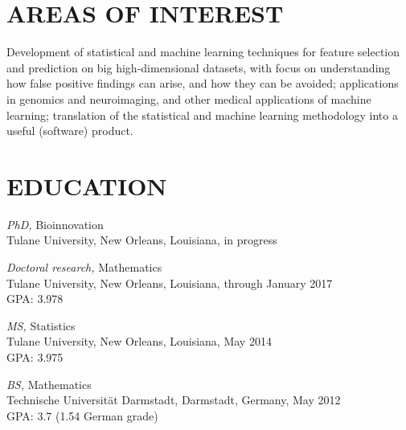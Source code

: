 \documentclass[margin]{res} %
\begin{document}
\begin{resume}
%
%
%
%

\section{AREAS OF INTEREST}

Development of statistical and machine learning techniques for feature selection and prediction on big high-dimensional datasets, with focus on understanding how false positive findings can arise, and how they can be avoided;
applications in genomics and neuroimaging, and other medical applications of machine learning;
translation of the statistical and machine learning methodology into a useful (software) product.


\section{EDUCATION}

{\sl PhD,} Bioinnovation \\
Tulane University, New Orleans, Louisiana, in progress

{\sl Doctoral research,} Mathematics \\
Tulane University, New Orleans, Louisiana, through January 2017\\
GPA: 3.978

{\sl MS,} Statistics \\
Tulane University, New Orleans, Louisiana, May 2014\\
GPA: 3.975

{\sl BS,} Mathematics\\
Technische Universit\"{a}t Darmstadt, Darmstadt, Germany, May 2012\\
GPA: 3.7 (1.54 German grade)


\end{resume}
\end{document}
